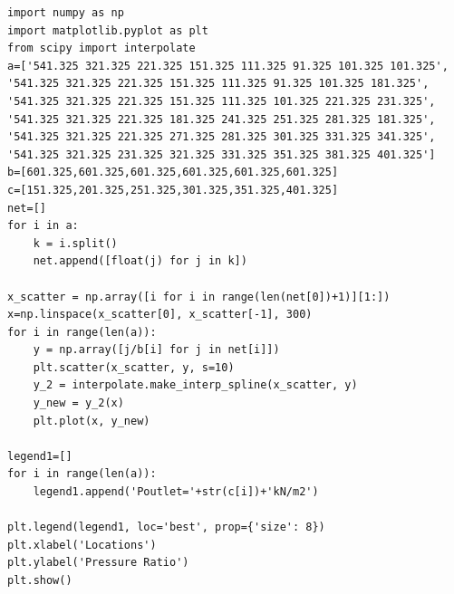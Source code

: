 \begin{framed}
\begin{verbatim}
import numpy as np
import matplotlib.pyplot as plt
from scipy import interpolate
a=['541.325 321.325 221.325 151.325 111.325 91.325 101.325 101.325',
'541.325 321.325 221.325 151.325 111.325 91.325 101.325 181.325',
'541.325 321.325 221.325 151.325 111.325 101.325 221.325 231.325',
'541.325 321.325 221.325 181.325 241.325 251.325 281.325 181.325',
'541.325 321.325 221.325 271.325 281.325 301.325 331.325 341.325',
'541.325 321.325 231.325 321.325 331.325 351.325 381.325 401.325']
b=[601.325,601.325,601.325,601.325,601.325,601.325]
c=[151.325,201.325,251.325,301.325,351.325,401.325]
net=[]
for i in a:
    k = i.split()
    net.append([float(j) for j in k])

x_scatter = np.array([i for i in range(len(net[0])+1)][1:])
x=np.linspace(x_scatter[0], x_scatter[-1], 300)
for i in range(len(a)):
    y = np.array([j/b[i] for j in net[i]])
    plt.scatter(x_scatter, y, s=10)
    y_2 = interpolate.make_interp_spline(x_scatter, y)
    y_new = y_2(x)
    plt.plot(x, y_new)

legend1=[]
for i in range(len(a)):    
    legend1.append('Poutlet='+str(c[i])+'kN/m2')
    
plt.legend(legend1, loc='best', prop={'size': 8})   
plt.xlabel('Locations')
plt.ylabel('Pressure Ratio')
plt.show()
\end{verbatim}
\end{framed}

